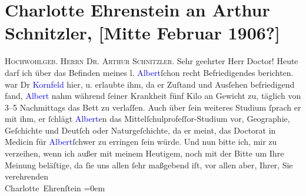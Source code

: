 

               \section[Charlotte Ehrenstein an Arthur Schnitzler, {[}Mitte Februar 1906?{]}]{ Charlotte Ehrenstein an Arthur Schnitzler, {[}Mitte Februar
                    1906?{]}}\nopagebreak{}\rehead{ }\normalsize\beginnumbering{} \toendnotes[C]{\smallbreak\pagebreak[2]} 
\toendnotes[C]{\smallbreak}\pstart
           \noindent{}{\pb}\textsc{Hochwohlgeb. Herrn Dr. Arthur Schnitzler}.\pend
           \pstart\center{}Sehr geehrter Herr Doctor!\pend\pstart
           Heute darf ich über das Befinden meines l. \textcolor{blue}{Albert}{}\ledrightnote{\textcolor{blue}{Albert Ehrenstein}}{ }ſchon recht Befriedigendes berichten. \label{K_L01584_1v}\label{K_L01584_1h} war Dr \textcolor{blue}{Kornfeld}{}\ledrightnote{\textcolor{blue}{Sigmund Kornfeld}} hier, u.
                    erlaubte ihm, da er Zuſtand und Ausſehen befriedigend fand, \textcolor{blue}{Albert}{}\ledrightnote{\textcolor{blue}{Albert Ehrenstein}} nahm während ſeiner Krankheit fünf Kilo an Gewicht
                    zu, täglich von 3–5 Nachmittags das Bett zu verlaſſen. Auch über ſein weiteres
                    Studium ſprach er mit ihm, er ſchlägt \textcolor{blue}{Albert}{}\ledrightnote{\textcolor{blue}{Albert Ehrenstein}}en das Mittelſchulprofeſſor-Studium vor, Geographie, Geſchichte und
                    Deutſch oder Naturgeſchichte, da er {\pb}meint, das
                    Doctorat in Medicin für \textcolor{blue}{Albert}{}\ledrightnote{\textcolor{blue}{Albert Ehrenstein}}{ }ſchwer zu erringen ſein würde. Und nun bitte
                    ich, mir zu verzeihen, wenn ich außer mit meinem Heutigem, noch mit der Bitte um
                    Ihre Meinung beläſtige, da ſie uns allen ſehr maßgebend iſt, vor allen aber,
                    Ihrer, Sie \pend
           \pstart
           verehrenden{\\[\baselineskip]}\spacefill\mbox{Charlotte Ehrenſtein}\pend
           \leftskip=0em{}\endnumbering{}  
      